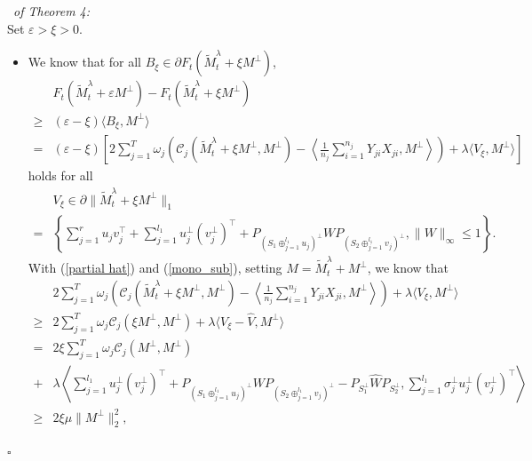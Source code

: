 \documentclass[12pt]{article}
\newenvironment{pf}{{\noindent\it Proof}\ }{\hfill $\square$\par}
\begin{document}
\begin{pf}{\it of Theorem 4:}
\begin{equation}
  \end{equation}
  Set $\varepsilon > \xi>0$.
  \begin{itemize}
  \item[a.] We know that for all $B_\xi \in \partial F_t(\widetilde{M}_t^\lambda +\xi M^{\perp})$,
  \begin{equation*}
  \begin{aligned}
  &F_t(\widetilde{M}_t^\lambda +\varepsilon M^{\perp})- F_t(\widetilde{M}_t^\lambda +\xi M^{\perp})  \\\ge &(\varepsilon-\xi )\langle B_\xi,M^{\perp}\rangle\\=&
  (\varepsilon-\xi)\left[2\sum_{j=1}^T \omega_j \left(\mathcal{C}_j( \widetilde{M}_t^\lambda + \xi M^{\perp}, M^{\perp})- \left\langle\frac{1}{n_j}\sum_{i=1}^{n_j}Y_{j i}X_{j i},M^{\perp}\right\rangle\right) +\lambda \langle V_\xi,M^{\perp}\rangle \right]
  \end{aligned}
  \end{equation*}
  holds for all
  \begin{align*}&V_\xi \in \partial \|\widetilde{M}_t^\lambda +\xi M^{\perp}\|_1 \\ =&
  \left\{\sum_{j=1}^r u_j v_j^\top +\sum_{j=1}^{l_1} u^{\perp}_j (v^{\perp}_j)^\top + P_{(S_1\oplus_{j=1}^{l_1} u_j)^{\perp}}W P_{(S_2\oplus_{j=1}^{l_1} v_j)^{\perp}},\|W\|_{\infty}\le 1\right\}.
  \end{align*}
  With (\ref{partial hat}) and (\ref{mono_sub}), setting $M= \widetilde{M}_t^\lambda +M^{\perp}$, we know that
  \begin{equation*}
  \begin{aligned}
  &2\sum_{j=1}^T \omega_j \left(\mathcal{C}_j( \widetilde{M}_t^\lambda + \xi M^{\perp}, M^{\perp}) - \left\langle\frac{1}{n_j}\sum_{i=1}^{n_j}Y_{j i}X_{j i},M^{\perp}\right\rangle\right) +\lambda \langle V_\xi,M^{\perp}\rangle
  \\\ge &
  2\sum_{j=1}^T \omega_j \mathcal{C}_j( \xi M^{\perp},M^{\perp}) + \lambda\langle V_\xi - \widehat{V},M^{\perp}\rangle \\=&
  2\xi \sum_{j=1}^T \omega_j \mathcal{C}_j(M^{\perp},M^{\perp})\\+&\lambda \left\langle  \sum_{j=1}^{l_1}u^{\perp}_j (v^{\perp}_j)^\top + P_{(S_1\oplus_{j=1}^{l_1} u_j)^{\perp}}W P_{(S_2\oplus_{j=1}^{l_1} v_j)^{\perp}} - P_{S_1^{\perp}} \widehat{W}P_{S_2^{\perp}},\sum_{j=1}^{l_1}\sigma^\perp_j u_j^\perp (v_j^\perp)^\top\right\rangle \\\ge &
  2\xi\mu\|M^\perp\|^2_2,
  \end{aligned}

\end{equation*}
\end{itemize}
\end{pf}
\end{document}
